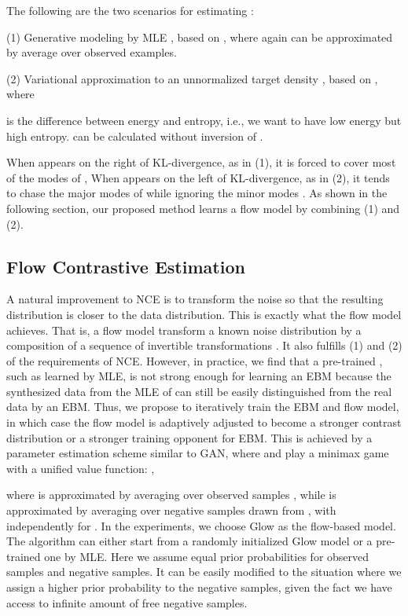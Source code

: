 \documentclass[10pt,twocolumn,letterpaper]{article}
\begin{document}
The following are the two scenarios for estimating :

(1) Generative modeling by MLE \cite{dinh2014nice,dinh2016density, kingma2018Glow,grathwohl2018ffjord,behrmann2018invertible, kumar2019videoflow, tran2019discrete}, based on , where again  can be approximated by average over observed examples. 

(2) Variational approximation to an unnormalized target density  \cite{kingma2013auto,rezende2015variational, kingma2016improved,kingma2014efficient, khemakhem2019variational}, based on , where 
 
 is the difference between energy and entropy, i.e., we want  to have low energy but high entropy.  can be calculated without inversion of . 

When  appears on the right of KL-divergence, as in (1), it is forced to cover most of the modes of , When  appears on the left of KL-divergence, as in (2), it tends to chase the major modes of  while ignoring the minor modes \cite{murphy2012machine,fox2012tutorial}. As shown in the following section, our proposed method learns a flow model by combining (1) and (2). 

\subsection{Flow Contrastive Estimation}

A natural improvement to NCE is to transform the noise so that the resulting distribution is closer to the data distribution. This is exactly what the flow model achieves. That is, a flow model transform a known noise distribution  by a composition of a sequence of invertible transformations . It also fulfills (1) and (2) of the requirements of NCE. However, in practice, we find that a pre-trained , such as learned by MLE, is not strong enough for learning an EBM  because the synthesized data from the MLE of  can still be easily distinguished from the real data by an EBM. Thus, we propose to iteratively train the EBM and flow model, in which case the flow model is adaptively adjusted to become a stronger contrast distribution or a stronger training opponent for EBM. This is achieved by a parameter estimation scheme similar to GAN, where  and  play a minimax game with a unified value function: , 

  where  is approximated by averaging over observed samples , while  is approximated by averaging over negative samples  drawn from , with  independently for . In the experiments, we choose Glow \cite{kingma2018Glow} as the flow-based model. The algorithm can either start from a randomly initialized Glow model or a pre-trained one by MLE. Here we assume equal prior probabilities for observed samples and negative samples. It can be easily modified to the situation where we assign a higher prior probability to the negative samples, given the fact we have access to infinite amount of free negative samples. 
\end{document}
